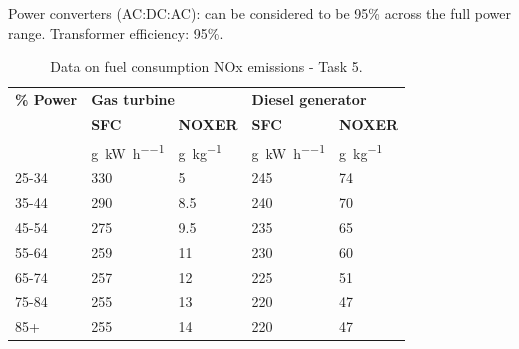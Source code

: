 Power converters (AC:DC:AC): can be considered to be 95\% across the full power range. Transformer efficiency: 95\%.
\begin{table}[H]
    \centering
    \begin{tabular}{@{}lllll@{}}
        \toprule
        \textbf{\% Power} & \multicolumn{2}{l}{\textbf{Gas turbine}} & \multicolumn{2}{l}{\textbf{Diesel generator}}                                                                \\
                          & \textbf{SFC}                             & \textbf{NOXER}                                & \textbf{SFC}                      & \textbf{NOXER}           \\
                          & \si{\gram\per\kilo\watt\per\hour}        & \si{\gram\per\kilo\gram}                      & \si{\gram\per\kilo\watt\per\hour} & \si{\gram\per\kilo\gram} \\
        \midrule
        25-34             & 330                                      & 5                                             & 245                               & 74                       \\
        35-44             & 290                                      & 8.5                                           & 240                               & 70                       \\
        45-54             & 275                                      & 9.5                                           & 235                               & 65                       \\
        55-64             & 259                                      & 11                                            & 230                               & 60                       \\
        65-74             & 257                                      & 12                                            & 225                               & 51                       \\
        75-84             & 255                                      & 13                                            & 220                               & 47                       \\
        85+               & 255                                      & 14                                            & 220                               & 47                       \\
        \bottomrule
    \end{tabular}
    \caption{Data on fuel consumption NOx emissions - Task 5.}
    \label{task5Table}
\end{table}

